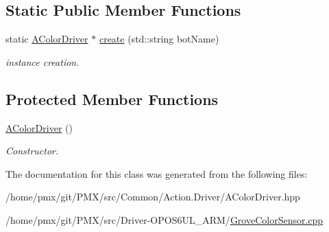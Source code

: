 \subsection*{Static Public Member Functions}
\begin{DoxyCompactItemize}
\item 
\mbox{\label{classAColorDriver_ad569d1e4c0e481fdba30a6e5c9691743}} 
static \hyperlink{classAColorDriver}{A\+Color\+Driver} $\ast$ \hyperlink{classAColorDriver_ad569d1e4c0e481fdba30a6e5c9691743}{create} (std\+::string bot\+Name)
\begin{DoxyCompactList}\small\item\em instance creation. \end{DoxyCompactList}\end{DoxyCompactItemize}
\subsection*{Protected Member Functions}
\begin{DoxyCompactItemize}
\item 
\mbox{\label{classAColorDriver_a90d8bb79fd76c030f31e29a32c32834a}} 
\hyperlink{classAColorDriver_a90d8bb79fd76c030f31e29a32c32834a}{A\+Color\+Driver} ()
\begin{DoxyCompactList}\small\item\em Constructor. \end{DoxyCompactList}\end{DoxyCompactItemize}


The documentation for this class was generated from the following files\+:\begin{DoxyCompactItemize}
\item 
/home/pmx/git/\+P\+M\+X/src/\+Common/\+Action.\+Driver/A\+Color\+Driver.\+hpp\item 
/home/pmx/git/\+P\+M\+X/src/\+Driver-\/\+O\+P\+O\+S6\+U\+L\+\_\+\+A\+R\+M/\hyperlink{GroveColorSensor_8cpp}{Grove\+Color\+Sensor.\+cpp}\end{DoxyCompactItemize}

